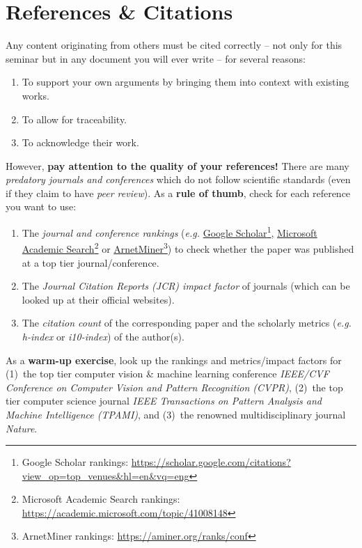 \documentclass[11pt,a4paper]{article}
\begin{document}
\newpage
\section{References \& Citations}
\label{sec-references}

Any content originating from others must be cited correctly -- not only for this seminar but in any document you will ever write -- for several reasons:
\begin{enumerate}
  \item To support your own arguments by bringing them into context with existing works.
  \item To allow for traceability.
  \item To acknowledge their work.
\end{enumerate}
However, \textbf{pay attention to the quality of your references!}
There are many \emph{predatory journals and conferences} which do not follow scientific standards (even if they claim to have \emph{peer review}). As a \textbf{rule of thumb}, check for each reference you want to use:
\begin{enumerate}
  \item The \emph{journal and conference rankings} (\emph{e.g.} \href{https://scholar.google.com/citations?view_op=top_venues&hl=en&vq=eng}{Google Scholar}\footnote{Google Scholar rankings: \url{https://scholar.google.com/citations?view_op=top_venues&hl=en&vq=eng}}, \href{https://academic.microsoft.com/topic/41008148}{Microsoft Academic Search}\footnote{Microsoft Academic Search rankings: \url{https://academic.microsoft.com/topic/41008148}} or \href{https://aminer.org/ranks/conf}{ArnetMiner}\footnote{ArnetMiner rankings: \url{https://aminer.org/ranks/conf}}) to check whether the paper was published at a top tier journal/conference.
  \item The \emph{Journal Citation Reports (JCR) impact factor} of journals (which can be looked up at their official websites). 
  \item The \emph{citation count} of the corresponding paper and the scholarly metrics (\emph{e.g.} \emph{h-index} or \emph{i10-index}) of the author(s).
\end{enumerate}
As a \textbf{warm-up exercise}, look up the rankings and metrics/impact factors for (1)~the top tier computer vision \& machine learning conference \emph{IEEE/CVF Conference on Computer Vision and Pattern Recognition (CVPR)}, (2)~the top tier computer science journal \emph{IEEE Transactions on Pattern Analysis and Machine Intelligence (TPAMI)}, and (3)~the renowned multidisciplinary journal \emph{Nature}.
\end{document}
